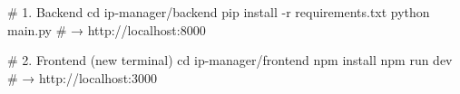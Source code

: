 # 1. Backend
cd ip-manager/backend
pip install -r requirements.txt
python main.py          # → http://localhost:8000

# 2. Frontend (new terminal)
cd ip-manager/frontend
npm install 
 npm run dev   # → http://localhost:3000